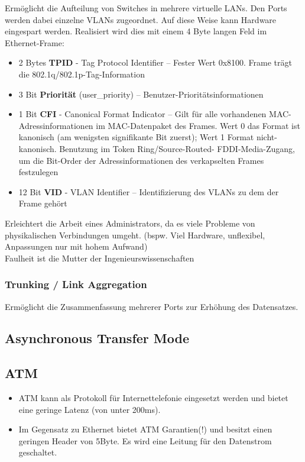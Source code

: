 \documentclass{article} %
\begin{document}
Ermöglicht die Aufteilung von Switches in mehrere virtuelle LANs.
Den Ports werden dabei einzelne VLANs zugeordnet.
Auf diese Weise kann Hardware eingespart werden.
Realisiert wird dies mit einem 4 Byte langen Feld im Ethernet-Frame:
\begin{itemize}
	\item 2 Bytes \textbf{TPID} - Tag Protocol Identifier – Fester Wert 0x8100. Frame
	trägt die 802.1q/802.1p-Tag-Information
	\item 3 Bit \textbf{Priorität} (user\_priority) – Benutzer-Prioritätsinformationen
	\item 1 Bit \textbf{CFI} - Canonical Format Indicator – Gilt für alle vorhandenen
MAC-Adressinformationen im MAC-Datenpaket des Frames. Wert 0
das Format ist kanonisch (am wenigsten signifikante Bit zuerst); Wert
1 Format nicht-kanonisch. Benutzung im Token Ring/Source-Routed-
FDDI-Media-Zugang, um die Bit-Order der Adressinformationen des
verkapselten Frames festzulegen
	\item 12 Bit \textbf{VID} - VLAN Identifier – Identifizierung des VLANs zu dem der
Frame gehört
\end{itemize}
Erleichtert die Arbeit eines Administrators, da es viele Probleme von physikalischen Verbindungen umgeht. (bspw. Viel Hardware, unflexibel, Anpassungen nur mit hohem Aufwand)\\


\glqq Faulheit ist die Mutter der Ingenieurswissenschaften\grqq\\
\subsubsection{Trunking / Link Aggregation}
Ermöglicht die Zusammenfassung mehrerer Ports zur Erhöhung des Datensatzes.

\subsection{Asynchronous Transfer Mode}

\subsection{ATM}
	\begin{itemize}
		\item ATM kann als Protokoll für Internettelefonie eingesetzt werden und bietet eine geringe Latenz (von unter 200ms).
		\item Im Gegensatz zu Ethernet bietet ATM Garantien(!) und besitzt einen geringen Header von 5Byte. Es wird eine Leitung für den Datenstrom geschaltet.
		
	\end{itemize}
\end{document}
